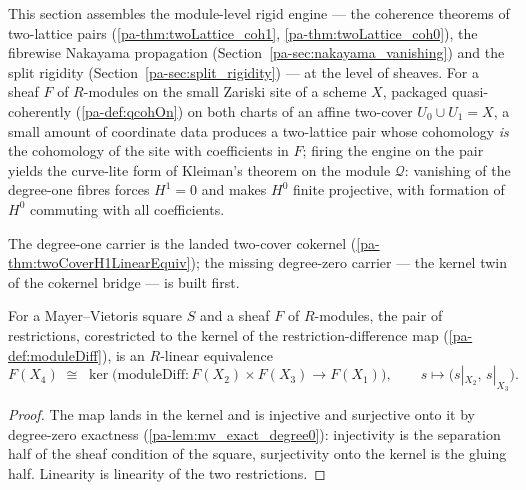 This section assembles the module-level rigid engine --- the coherence theorems of
two-lattice pairs (\ref{pa-thm:twoLattice_coh1}, \ref{pa-thm:twoLattice_coh0}), the fibrewise
Nakayama propagation (Section~\ref{pa-sec:nakayama_vanishing}) and the split rigidity
(Section~\ref{pa-sec:split_rigidity}) --- at the level of sheaves. For a sheaf \(F\) of
\(R\)-modules on the small Zariski site of a scheme \(X\), packaged quasi-coherently
(\ref{pa-def:qcohOn}) on both charts of an affine two-cover \(U_0 \cup U_1 = X\), a small
amount of coordinate data produces a two-lattice pair whose cohomology \emph{is} the
cohomology of the site with coefficients in \(F\); firing the engine on the pair yields
the curve-lite form of Kleiman's theorem on the module \(\mathcal Q\): vanishing of the
degree-one fibres forces \(H^1 = 0\) and makes \(H^0\) finite projective, with formation
of \(H^0\) commuting with all coefficients.

The degree-one carrier is the landed two-cover cokernel
(\ref{pa-thm:twoCoverH1LinearEquiv}); the missing degree-zero carrier --- the kernel twin of
the cokernel bridge --- is built first.

\begin{theorem}
  \label{pa-thm:sectionsKerEquiv}
  \leanok

  For a Mayer--Vietoris square \(S\) and a sheaf \(F\) of \(R\)-modules, the pair of
  restrictions, corestricted to the kernel of the restriction-difference map
  (\ref{pa-def:moduleDiff}), is an \(R\)-linear equivalence
  \[
    F(X_4) \;\cong\; \ker\bigl(\mathrm{moduleDiff} : F(X_2) \times F(X_3) \to
      F(X_1)\bigr),
    \qquad s \longmapsto \bigl(s|_{X_2},\, s|_{X_3}\bigr).
  \]
\end{theorem}
\begin{proof}
  \leanok
  The map lands in the kernel and is injective and surjective onto it by degree-zero
  exactness (\ref{pa-lem:mv_exact_degree0}): injectivity is the separation half of the
  sheaf condition of the square, surjectivity onto the kernel is the gluing half.
  Linearity is linearity of the two restrictions.
\end{proof}

